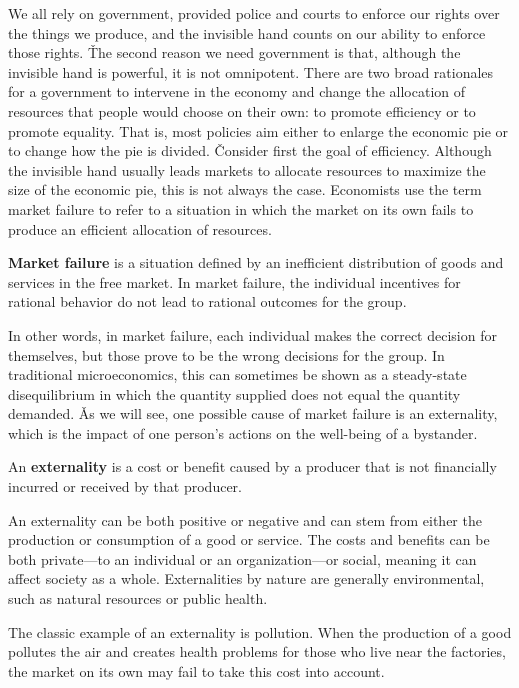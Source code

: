 We all rely on government, provided police and courts to enforce our rights over the things we produce, and the
invisible hand counts on our ability to enforce those rights. \v

The second reason we need government is that, although the invisible hand is powerful, it is not omnipotent. There
are two broad rationales for a government to intervene in the economy and change the allocation of resources that
people would choose on their own: to promote efficiency or to promote equality. That is, most policies aim either to
enlarge the economic pie or to change how the pie is divided. \v

Consider first the goal of efficiency. Although the invisible hand usually leads markets to allocate resources to
maximize the size of the economic pie, this is not always the case. Economists use the term market failure to refer
to a situation in which the market on its own fails to produce an efficient allocation of resources.

\textbf{Market failure} is a situation defined by an inefficient distribution of goods and services in the free
market. In market failure, the individual incentives for rational behavior do not lead to rational outcomes for the
group.
\ed

In other words, in market failure, each individual makes the correct decision for themselves, but those prove to be
the wrong decisions for the group. In traditional microeconomics, this can sometimes be shown as a steady-state
disequilibrium in which the quantity supplied does not equal the quantity demanded. \v

As we will see, one possible cause of market failure is an externality, which is the impact of one person's actions
on the well-being of a bystander.

\bd[Externality]
An \textbf{externality} is a cost or benefit caused by a producer that is not financially incurred or received by that
producer.
\ed

An externality can be both positive or negative and can stem from either the production or consumption of a good or
service. The costs and benefits can be both private—to an individual or an organization—or social, meaning it can
affect society as a whole. Externalities by nature are generally environmental, such as natural resources or public
health.

\be
The classic example of an externality is pollution. When the production of a good pollutes the air and creates health
problems for those who live near the factories, the market on its own may fail to take this cost into account.
\ee

